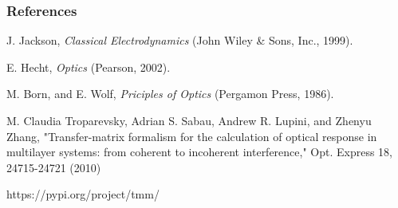 \documentclass{beamer}
\begin{document}
\begin{frame}


\frametitle{References}


\begin{thebibliography}{1}
	
 J. Jackson, \textit{Classical Electrodynamics} (John Wiley \& Sons, Inc., 1999).
	
 E. Hecht, \textit{Optics} (Pearson, 2002).
	
 M. Born, and E. Wolf, \textit{Priciples of Optics} (Pergamon Press, 1986).
	
 M. Claudia Troparevsky, Adrian S. Sabau, Andrew R. Lupini, and Zhenyu Zhang, "Transfer-matrix formalism for the calculation of optical response in multilayer systems: from coherent to incoherent interference," Opt. Express 18, 24715-24721 (2010)
	
 https://pypi.org/project/tmm/
	
\end{thebibliography}



\end{frame}
\end{document}
